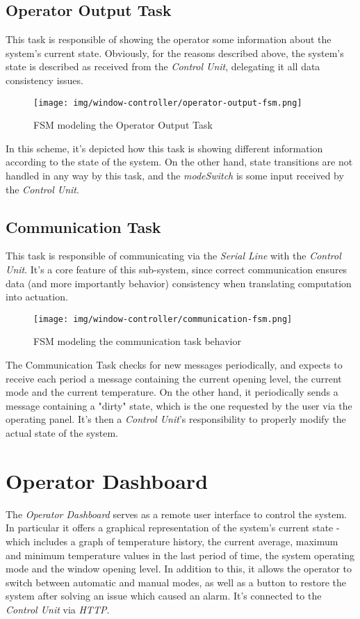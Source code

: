 \documentclass[a4paper,12pt]{report}
\begin{document}
		\subsection{Operator Output Task}
		This task is responsible of showing the operator some information about the system's current state. Obviously, for the reasons described above, the system's state is described as received from the \textit{Control Unit}, delegating it all data consistency issues.
		\begin{figure}[H]
			\centering{}
			\texttt{[image: img/window-controller/operator-output-fsm.png]}
			\caption{FSM modeling the Operator Output Task}
			\label{img:window-controller/operator-output-fsm}
		\end{figure}
		In this scheme, it's depicted how this task is showing different information according to the state of the system. On the other hand, state transitions are not handled in any way by this task, and the \textit{modeSwitch} is some input received by the \textit{Control Unit}.
		\subsection{Communication Task}
		This task is responsible of communicating via the \textit{Serial Line} with the \textit{Control Unit}. It's a core feature of this sub-system, since correct communication ensures data (and more importantly behavior) consistency when translating computation into actuation.
		\begin{figure}[H]
			\centering{}
			\texttt{[image: img/window-controller/communication-fsm.png]}
			\caption{FSM modeling the communication task behavior}
			\label{img:window-controller/communication-fsm}
		\end{figure}
		The Communication Task checks for new messages periodically, and expects to receive each period a message containing the current opening level, the current mode and the current temperature. On the other hand, it periodically sends a message containing a "dirty" state, which is the one requested by the user via the operating panel. It's then a \textit{Control Unit}'s responsibility to properly modify the actual state of the system.
	\section{Operator Dashboard}
	The \textit{Operator Dashboard} serves as a remote user interface to control the system. In particular it offers a graphical representation of the system's current state - which includes a graph of temperature history, the current average, maximum and minimum temperature values in the last period of time, the system operating mode and the window opening level. In addition to this, it allows the operator to switch between automatic and manual modes, as well as a button to restore the system after solving an issue which caused an alarm. It's connected to the \textit{Control Unit} via \textit{HTTP}.
\end{document}

